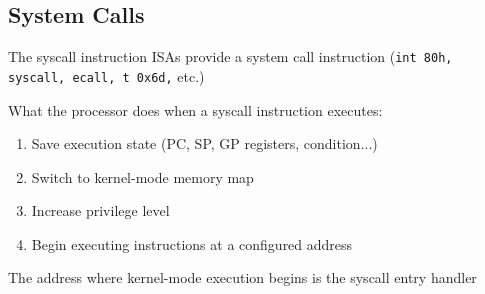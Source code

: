 \documentclass[handout]{beamer}
\begin{document}
%

% 

\subsection{System Calls}
\begin{frame}{The syscall instruction}
ISAs provide a system call instruction (\texttt{int 80h, syscall, ecall, t 0x6d,} etc.)

\pause
What the processor does when a syscall instruction executes:
\begin{enumerate}
 \item Save execution state (PC, SP, GP registers, condition...)
 \item Switch to kernel-mode memory map
 \item Increase privilege level
 \item Begin executing instructions at a configured address
\end{enumerate}

The address where kernel-mode execution begins is the syscall entry handler

\end{frame}
\end{document}

